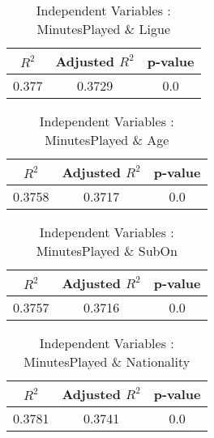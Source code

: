 \documentclass[12pt]{article}
\begin{document}
\hfill
\begin{minipage}{0.4\textwidth}
	\begin{table}[H]
		\centering
		\caption{Independent Variables : MinutesPlayed \& Ligue}\label{table:1a}
		{\begin{tabular}{|c|c|c|}
				\hline
				$ R^2 $ & Adjusted $ R^2 $ & p-value \\
				\hline
				0.377 & 0.3729 & 0.0 \\
				\hline
			\end{tabular}
		}
	\end{table}
\end{minipage}
\hfill
\begin{minipage}{0.4\textwidth}
	\begin{table}[H]
		\centering
		\caption{Independent Variables : MinutesPlayed \& Age}\label{table:1a}
		{\begin{tabular}{|c|c|c|}
				\hline
				$ R^2 $ & Adjusted $ R^2 $ & p-value \\
				\hline
				0.3758 & 0.3717 & 0.0 \\
				\hline
			\end{tabular}
		}
	\end{table}
\end{minipage}
\hfill
\begin{minipage}{0.4\textwidth}
	\begin{table}[H]
		\centering
		\caption{Independent Variables : MinutesPlayed \& SubOn}\label{table:1a}
		{\begin{tabular}{|c|c|c|}
				\hline
				$ R^2 $ & Adjusted $ R^2 $ & p-value \\
				\hline
				0.3757 & 0.3716 & 0.0 \\
				\hline
			\end{tabular}
		}
	\end{table}
\end{minipage}
\hfill
\begin{minipage}{0.4\textwidth}
	\begin{table}[H]
		\centering
		\caption{Independent Variables : MinutesPlayed \& Nationality}\label{table:1a}
		{\begin{tabular}{|c|c|c|}
				\hline
				$ R^2 $ & Adjusted $ R^2 $ & p-value \\
				\hline
				0.3781 & 0.3741 & 0.0 \\
				\hline
			\end{tabular}
		}
	\end{table}
\end{minipage}
\hfill
\end{document}
